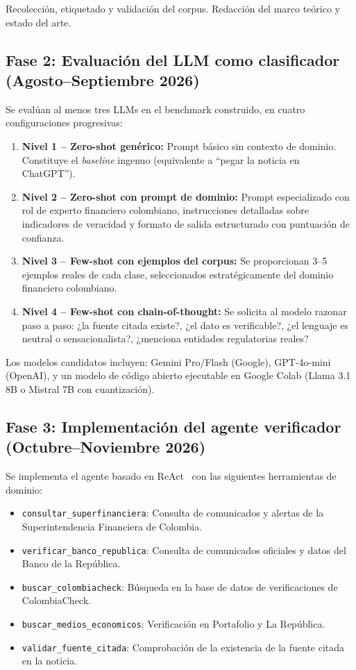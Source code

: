 Recolección, etiquetado y validación del corpus. Redacción del marco teórico y estado del arte.

\subsection{Fase 2: Evaluación del LLM como clasificador (Agosto--Septiembre 2026)}

Se evalúan al menos tres LLMs en el benchmark construido, en cuatro configuraciones progresivas:

\begin{enumerate}
    \item \textbf{Nivel 1 -- Zero-shot genérico:} Prompt básico sin contexto de dominio. Constituye el \textit{baseline} ingenuo (equivalente a ``pegar la noticia en ChatGPT'').
    \item \textbf{Nivel 2 -- Zero-shot con prompt de dominio:} Prompt especializado con rol de experto financiero colombiano, instrucciones detalladas sobre indicadores de veracidad y formato de salida estructurado con puntuación de confianza.
    \item \textbf{Nivel 3 -- Few-shot con ejemplos del corpus:} Se proporcionan 3--5 ejemplos reales de cada clase, seleccionados estratégicamente del dominio financiero colombiano.
    \item \textbf{Nivel 4 -- Few-shot con chain-of-thought:} Se solicita al modelo razonar paso a paso: ¿la fuente citada existe?, ¿el dato es verificable?, ¿el lenguaje es neutral o sensacionalista?, ¿menciona entidades regulatorias reales?
\end{enumerate}

Los modelos candidatos incluyen: Gemini Pro/Flash (Google), GPT-4o-mini (OpenAI), y un modelo de código abierto ejecutable en Google Colab (Llama 3.1 8B o Mistral 7B con cuantización).

\subsection{Fase 3: Implementación del agente verificador (Octubre--Noviembre 2026)}

Se implementa el agente basado en ReAct~\cite{Yao2023} con las siguientes herramientas de dominio:

\begin{itemize}
    \item \texttt{consultar\_superfinanciera}: Consulta de comunicados y alertas de la Superintendencia Financiera de Colombia.
    \item \texttt{verificar\_banco\_republica}: Consulta de comunicados oficiales y datos del Banco de la República.
    \item \texttt{buscar\_colombiacheck}: Búsqueda en la base de datos de verificaciones de ColombiaCheck.
    \item \texttt{buscar\_medios\_economicos}: Verificación en Portafolio y La República.
    \item \texttt{validar\_fuente\_citada}: Comprobación de la existencia de la fuente citada en la noticia.
\end{itemize}

